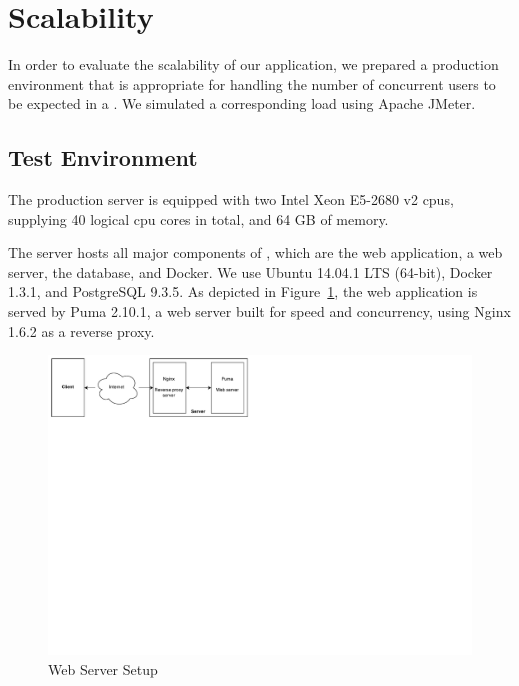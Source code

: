 \section{Scalability}\label{section:scalability}

In order to evaluate the scalability of our application, we prepared a production environment that is appropriate for handling the number of concurrent users to be expected in a \mooc. We simulated a corresponding load using Apache JMeter.

\subsection{Test Environment}

The production server is equipped with two Intel Xeon E5-2680 v2 \glspl{cpu}, supplying 40 logical \gls{cpu} cores in total, and 64 GB of memory.

The server hosts all major components of \tool, which are the web application, a web server, the database, and Docker. We use Ubuntu 14.04.1 LTS (64-bit), Docker 1.3.1, and PostgreSQL 9.3.5. As depicted in Figure~\ref{figure:server}, the web application is served by Puma 2.10.1, a web server built for speed and concurrency, using Nginx 1.6.2 as a reverse proxy.

\begin{figure}
\centering
\includegraphics[clip=true, trim=0.1cm 12.7cm 11.8cm 0.1cm, width=\textwidth]{images/server.pdf}
\caption{Web Server Setup}
\label{figure:server}
\end{figure}

